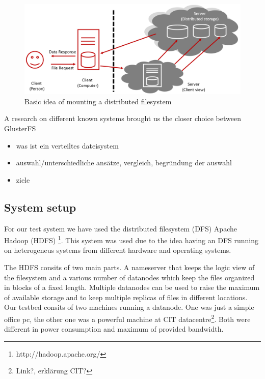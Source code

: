 \begin{figure}
\centering
\includegraphics[width=1\linewidth]{img/dfs_example.png}
\caption{Basic idea of mounting a distributed filesystem}
\label{fig:dfs_example}
\end{figure}


A research on different known systems brought us the closer choice between GlusterFS 



\begin{itemize}
\item was ist ein verteiltes dateisystem
\item auswahl/unterschiedliche ansätze, vergleich, begründung der auswahl
\item ziele
\end{itemize}

\subsection{System setup}

For our test system we have used the distributed filesystem (DFS) Apache Hadoop\textsuperscript{\textregistered} (HDFS) \footnote{http://hadoop.apache.org/}. This system was used due to the idea having an DFS running on heterogeneus systems from different hardware and operating systems. 

The HDFS consits of two main parts. A nameserver that keeps the logic view of the filesystem and a various number of datanodes which keep the files organized in blocks of a fixed length. Multiple datanodes can be used to raise the maximum of available storage and to keep multiple replicas of files in different locations. Our testbed consits of two machines running a datanode. One was just a simple office pc, the other one was a powerful machine at CIT datacentre\footnote{Link?, erklärung CIT?}. Both were different in power consumption and maximum of provided bandwidth. 

